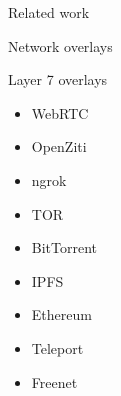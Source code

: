 \begin{frame}[fragile]{Related work}
\begin{block}{Network overlays}
\begin{block}{Layer 7 overlays}
\protect\hypertarget{layer-7-overlays}{}
\begin{itemize}
\tightlist
\item
  WebRTC
\item
  OpenZiti
\item
  ngrok
\item
  TOR
\item
  BitTorrent
\item
  IPFS
\item
  Ethereum
\item
  Teleport
\item
  Freenet
\end{itemize}
\end{block}
\end{block}
\end{frame}

